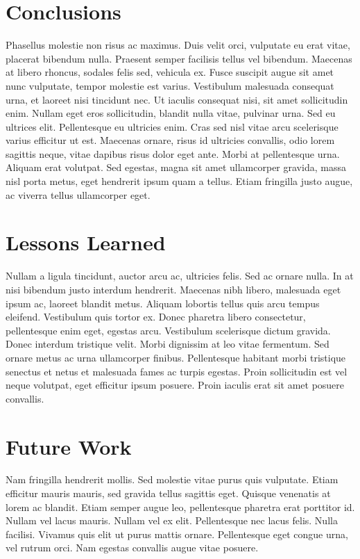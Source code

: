 \section{Conclusions}
Phasellus molestie non risus ac maximus. Duis velit orci, vulputate eu erat vitae, placerat bibendum nulla. Praesent semper facilisis tellus vel bibendum. Maecenas at libero rhoncus, sodales felis sed, vehicula ex. Fusce suscipit augue sit amet nunc vulputate, tempor molestie est varius. Vestibulum malesuada consequat urna, et laoreet nisi tincidunt nec. Ut iaculis consequat nisi, sit amet sollicitudin enim. Nullam eget eros sollicitudin, blandit nulla vitae, pulvinar urna. Sed eu ultrices elit. Pellentesque eu ultricies enim. Cras sed nisl vitae arcu scelerisque varius efficitur ut est. Maecenas ornare, risus id ultricies convallis, odio lorem sagittis neque, vitae dapibus risus dolor eget ante. Morbi at pellentesque urna. Aliquam erat volutpat. Sed egestas, magna sit amet ullamcorper gravida, massa nisl porta metus, eget hendrerit ipsum quam a tellus. Etiam fringilla justo augue, ac viverra tellus ullamcorper eget.

\section{Lessons Learned}
Nullam a ligula tincidunt, auctor arcu ac, ultricies felis. Sed ac ornare nulla. In at nisi bibendum justo interdum hendrerit. Maecenas nibh libero, malesuada eget ipsum ac, laoreet blandit metus. Aliquam lobortis tellus quis arcu tempus eleifend. Vestibulum quis tortor ex. Donec pharetra libero consectetur, pellentesque enim eget, egestas arcu. Vestibulum scelerisque dictum gravida. Donec interdum tristique velit. Morbi dignissim at leo vitae fermentum. Sed ornare metus ac urna ullamcorper finibus. Pellentesque habitant morbi tristique senectus et netus et malesuada fames ac turpis egestas. Proin sollicitudin est vel neque volutpat, eget efficitur ipsum posuere. Proin iaculis erat sit amet posuere convallis.

\section{Future Work}
Nam fringilla hendrerit mollis. Sed molestie vitae purus quis vulputate. Etiam efficitur mauris mauris, sed gravida tellus sagittis eget. Quisque venenatis at lorem ac blandit. Etiam semper augue leo, pellentesque pharetra erat porttitor id. Nullam vel lacus mauris. Nullam vel ex elit. Pellentesque nec lacus felis. Nulla facilisi. Vivamus quis elit ut purus mattis ornare. Pellentesque eget congue urna, vel rutrum orci. Nam egestas convallis augue vitae posuere.

\closepart

